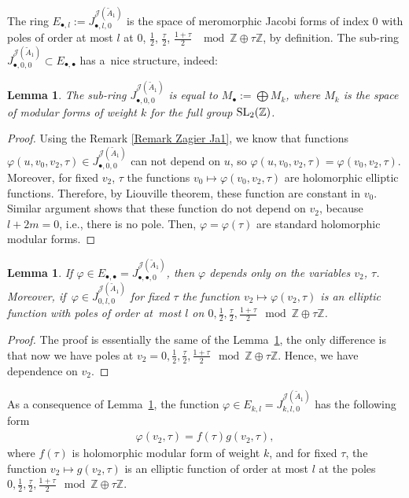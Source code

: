 \documentclass[pdftex]{sigma}%
\numberwithin{equation}{section}
\newtheorem{Lemma}[Theorem]{Lemma}
\newcommand{\Ja}{\mathcal{J}}
\begin{document}
The ring $E_{\bullet,l}:=J_{\bullet,l,0}^{\Ja(\tilde A_1)}$ is the space of meromorphic Jacobi forms of index $0$ with poles of order at most $l$ at $0$, $\frac{1}{2}$, $\frac{\tau}{2}$, $\frac{1+\tau}{2}$ $\mod \mathbb{Z}\oplus\tau\mathbb{Z}$, by definition. The sub-ring $J_{\bullet,0,0}^{\Ja(\tilde A_1)}\subset E_{\bullet,\bullet}$ has a~nice structure, indeed:
\begin{Lemma}\label{lemmamodular Jtildea1}
The sub-ring $J_{\bullet,0,0}^{\Ja(\tilde A_1)}$ is equal to $M_{\bullet}:=\bigoplus M_{k}$, where $M_k$ is the space of modular forms of weight $k$ for the full group ${\rm SL}_2(\mathbb{Z})$.
\end{Lemma}

\begin{proof}
Using the Remark \ref{Remark Zagier Ja1}, we know that functions $\varphi(u,v_0,v_2,\tau)\in J_{\bullet,0,0}^{\Ja(\tilde A_1)}$ can not depend on $u$, so $\varphi(u,v_0,v_2,\tau)=\varphi(v_0,v_2,\tau)$. Moreover, for fixed $v_2$, $\tau$ the functions $v_0\mapsto \varphi(v_0,v_2,\tau) $ are holomorphic elliptic functions. Therefore, by Liouville theorem, these function are constant in $v_0$. Similar argument shows that these function do not depend on $v_2$, because $l+2m=0$, i.e., there is no pole. Then, $\varphi=\varphi(\tau)$ are standard holomorphic modular forms.
\end{proof}

\begin{Lemma}\label{ringcoef Jtildea1}
If $\varphi \in E_{\bullet,\bullet}=J_{\bullet,\bullet,0}^{\Ja(\tilde A_1)}$, then $\varphi$ depends only on the variables $v_2$, $\tau$. Moreover, if~$\varphi\in J_{0,l,0}^{\Ja(\tilde A_1)}$ for fixed $\tau$ the function $v_2\mapsto \varphi(v_2,\tau)$ is an elliptic function with poles of order at~most $l$ on $0,\frac{1}{2}, \frac{\tau}{2}, \frac{1+\tau}{2}\mod \mathbb{Z}\oplus\tau\mathbb{Z}$.
\end{Lemma}

\begin{proof}
The proof is essentially the same of the Lemma~\ref{lemmamodular Jtildea1}, the only difference is that now we have poles at $v_2=0,\frac{1}{2}, \frac{\tau}{2}, \frac{1+\tau}{2}\mod \mathbb{Z}\oplus\tau\mathbb{Z}$. Hence, we have dependence on $v_2$.
\end{proof}

As a consequence of Lemma~\ref{ringcoef Jtildea1}, the function $\varphi \in E_{k,l}=J_{k,l,0}^{\Ja(\tilde A_1)}$ has the following form
\begin{gather*}
\varphi(v_2,\tau)=f(\tau)g(v_2,\tau),
\end{gather*}
 where $f(\tau)$ is holomorphic modular form of weight $k$, and for fixed $\tau$, the function $v_2\mapsto g(v_2,\tau)$ is an elliptic function of order at most $l$ at the poles $0,\frac{1}{2}, \frac{\tau}{2}, \frac{1+\tau}{2}\mod \mathbb{Z}\oplus\tau\mathbb{Z}$.
\end{document}
